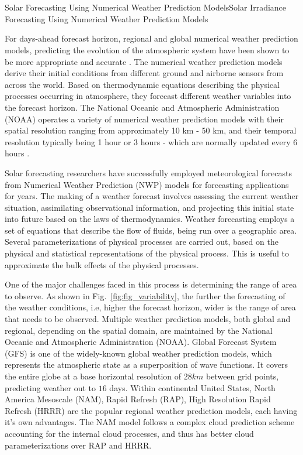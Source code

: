 \chapter{}{{Solar Forecasting Using Numerical Weather Prediction Models}}{Solar Irradiance Forecasting Using Numerical Weather Prediction Models}

For days-ahead forecast horizon, regional and global numerical weather prediction models, predicting the evolution of the atmospheric system have been shown to be more appropriate and accurate \cite{thesis_zach}. The numerical weather prediction models derive their initial conditions from different ground and airborne sensors from across the world. Based on thermodynamic equations describing the physical processes occurring in atmosphere, they forecast different weather variables into the forecast horizon. The National Oceanic and Atmospheric Administration (NOAA) operates a variety of numerical weather prediction models with their spatial resolution ranging from approximately 10 km - 50 km, and their temporal resolution typically being 1 hour or 3 hours -  which are normally updated every 6 hours \cite{multimodel_bestpractices}. 

\par Solar forecasting researchers have successfully employed meteorological forecasts from Numerical Weather Prediction (NWP) models for forecasting applications for years. The making of a weather forecast involves assessing the current weather situation, assimilating observational information, and projecting this initial state into future based on the laws of thermodynamics. Weather forecasting employs a set of equations that describe the flow of fluids, being run over a geographic area. Several parameterizations of physical processes are carried out, based on the physical and statistical representations of the physical process. This is useful to approximate the bulk effects of the physical processes.

\par One of the major challenges faced in this process is determining the range of area to observe. As shown in Fig.~\ref{fig:fig_variability}, the further the forecasting of the weather conditions, i.e, higher the forecast horizon, wider is the range of area that needs to be observed. Multiple weather prediction models, both global and regional, depending on the spatial domain, are maintained by the National Oceanic \restoregeometry\noindent and Atmospheric Administration (NOAA). Global Forecast System (GFS) is one of the widely-known global weather prediction models, which represents the atmospheric state as a superposition of wave functions. It covers the entire globe at a base horizontal resolution of $28km$ between grid points, predicting weather out to $16$ days. Within continental United States, North America Mesoscale (NAM), Rapid Refresh (RAP), High Resolution Rapid Refresh (HRRR) are the popular regional weather prediction models, each having it's own advantages. The NAM model follows a complex cloud prediction scheme accounting for the internal cloud processes, and thus has better cloud parameterizations over RAP and HRRR. 

